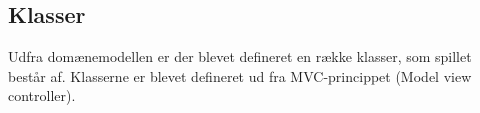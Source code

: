\subsection{Klasser}
Udfra domænemodellen er der blevet defineret en række klasser, som spillet består af. Klasserne er blevet defineret ud fra MVC-princippet (Model view controller). 

